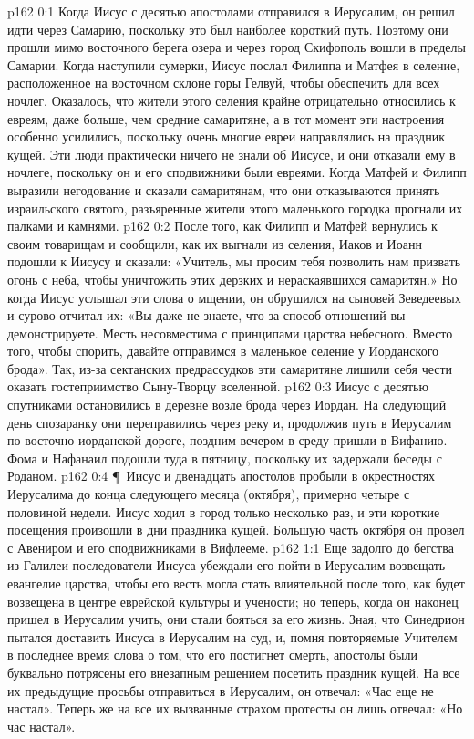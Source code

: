 \author{Комиссия срединников}
\vs p162 0:1 Когда Иисус с десятью апостолами отправился в Иерусалим, он решил идти через Самарию, поскольку это был наиболее короткий путь. Поэтому они прошли мимо восточного берега озера и через город Скифополь вошли в пределы Самарии. Когда наступили сумерки, Иисус послал Филиппа и Матфея в селение, расположенное на восточном склоне горы Гелвуй, чтобы обеспечить для всех ночлег. Оказалось, что жители этого селения крайне отрицательно относились к евреям, даже больше, чем средние самаритяне, а в тот момент эти настроения особенно усилились, поскольку очень многие евреи направлялись на праздник кущей. Эти люди практически ничего не знали об Иисусе, и они отказали ему в ночлеге, поскольку он и его сподвижники были евреями. Когда Матфей и Филипп выразили негодование и сказали самаритянам, что они отказываются принять израильского святого, разъяренные жители этого маленького городка прогнали их палками и камнями.
\vs p162 0:2 После того, как Филипп и Матфей вернулись к своим товарищам и сообщили, как их выгнали из селения, Иаков и Иоанн подошли к Иисусу и сказали: «Учитель, мы просим тебя позволить нам призвать огонь с неба, чтобы уничтожить этих дерзких и нераскаявшихся самаритян.» Но когда Иисус услышал эти слова о мщении, он обрушился на сыновей Зеведеевых и сурово отчитал их: «Вы даже не знаете, что за способ отношений вы демонстрируете. Месть несовместима с принципами царства небесного. Вместо того, чтобы спорить, давайте отправимся в маленькое селение у Иорданского брода». Так, из\hyp{}за сектанских предрассудков эти самаритяне лишили себя чести оказать гостеприимство Сыну\hyp{}Творцу вселенной.
\vs p162 0:3 Иисус с десятью спутниками остановились в деревне возле брода через Иордан. На следующий день спозаранку они переправились через реку и, продолжив путь в Иерусалим по восточно\hyp{}иорданской дороге, поздним вечером в среду пришли в Вифанию. Фома и Нафанаил подошли туда в пятницу, поскольку их задержали беседы с Роданом.
\vs p162 0:4 \P\ Иисус и двенадцать апостолов пробыли в окрестностях Иерусалима до конца следующего месяца (октября), примерно четыре с половиной недели. Иисус ходил в город только несколько раз, и эти короткие посещения произошли в дни праздника кущей. Большую часть октября он провел с Авениром и его сподвижниками в Вифлееме.
\vs p162 1:1 Еще задолго до бегства из Галилеи последователи Иисуса убеждали его пойти в Иерусалим возвещать евангелие царства, чтобы его весть могла стать влиятельной после того, как будет возвещена в центре еврейской культуры и учености; но теперь, когда он наконец пришел в Иерусалим учить, они стали бояться за его жизнь. Зная, что Синедрион пытался доставить Иисуса в Иерусалим на суд, и, помня повторяемые Учителем в последнее время слова о том, что его постигнет смерть, апостолы были буквально потрясены его внезапным решением посетить праздник кущей. На все их предыдущие просьбы отправиться в Иерусалим, он отвечал: «Час еще не настал». Теперь же на все их вызванные страхом протесты он лишь отвечал: «Но час настал».
